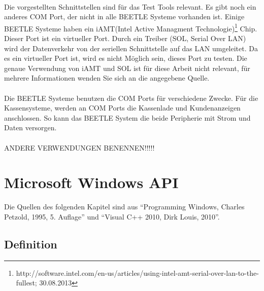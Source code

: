 \paragraph{}
Die vorgestellten Schnittstellen sind für das Test Tools relevant. Es gibt noch ein anderes COM Port, der nicht in alle BEETLE Systeme vorhanden ist. Einige BEETLE Systeme haben ein iAMT(Intel Active Managment Technologie)\footnote{http://software.intel.com/en-us/articles/using-intel-amt-serial-over-lan-to-the-fullest; 30.08.2013} Chip. Dieser Port ist ein virtueller Port. Durch ein Treiber (SOL, Serial Over LAN) wird der Datenverkehr von der seriellen Schnittstelle auf das LAN umgeleitet. Da es ein virtueller Port ist, wird es nicht Möglich sein, dieses Port zu testen. Die genaue Verwendung von iAMT und SOL ist für diese Arbeit nicht relevant, für mehrere Informationen wenden Sie sich an die angegebene Quelle.

\paragraph{}
Die BEETLE Systeme benutzen die COM Ports für verschiedene Zwecke. Für die Kassensysteme, werden an COM Ports die Kassenlade und Kundenanzeigen anschlossen. So kann das BEETLE System die beide Peripherie mit Strom und Daten versorgen.

\paragraph{}
ANDERE VERWENDUNGEN BENENNEN!!!!!





\newpage





\section{Microsoft Windows API}

Die Quellen des folgenden Kapitel sind aus "`Programming Windows, Charles Petzold, 1995, 5. Auflage"' und "`Visual C++ 2010, Dirk Louis, 2010"'.

\subsection{Definition}

